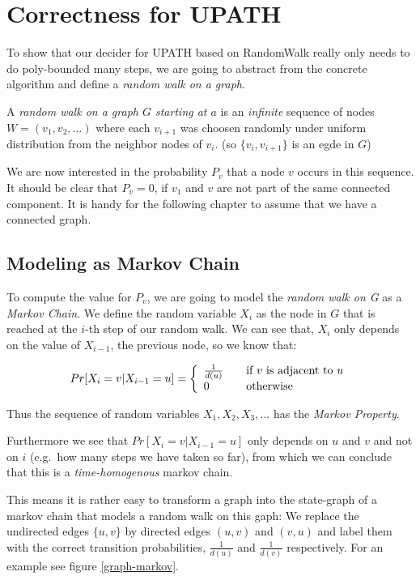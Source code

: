 \section{Correctness for UPATH}\label{correctness-for-upath}

To show that our decider for UPATH based on RandomWalk really only needs
to do poly-bounded many steps, we are going to abstract from the
concrete algorithm and define a \emph{random walk on a graph}.

A \emph{random walk on a graph $G$ starting at $a$} is an
\emph{infinite} sequence of nodes $W = (v_1, v_2, \dots)$ where each
$v_{i+1}$ was choosen randomly under uniform distribution from the
neighbor nodes of $v_i$. (so $\{v_i, v_{i+1}\}$ is an egde in $G$)

We are now interested in the probability $P_v$ that a node $v$ occurs in
this sequence. It should be clear that $P_v = 0$, if $v_1$ and $v$ are
not part of the same connected component. It is handy for the following
chapter to assume that we have a connected graph.

\subsection{Modeling as Markov Chain}\label{modeling-as-markov-chain}

To compute the value for $P_v$, we are going to model the \emph{random
walk on G} as a \emph{Markov Chain}. We define the random variable $X_i$
as the node in $G$ that is reached at the $i$-th step of our random
walk. We can see that, $X_i$ only depends on the value of $X_{i-1}$, the
previous node, so we know that:

\[ Pr[X_i = v | X_{i-1} = u] = \left\{
  \begin{array}{l l}
    \frac{1}{d(u)} & \quad \text{if $v$ is adjacent to $u$}\\
    0 & \quad \text{otherwise}
  \end{array} \right.
\]

Thus the sequence of random variables $X_1, X_2, X_3, ...$ has the
\emph{Markov Property}.

Furthermore we see that $Pr[X_i = v | X_{i-1} = u]$ only depends on $u$
and $v$ and not on $i$ (e.g.~how many steps we have taken so far), from
which we can conclude that this is a \emph{time-homogenous} markov
chain.

This means it is rather easy to transform a graph into the state-graph
of a markov chain that models a random walk on this gaph: We replace the
undirected edges $\{u, v\}$ by directed edges $(u, v)$ and $(v, u)$ and
label them with the correct transition probabilities, $\frac{1}{d(u)}$
and $\frac{1}{d(v)}$ respectively. For an example see figure
\ref{graph-markov}.

